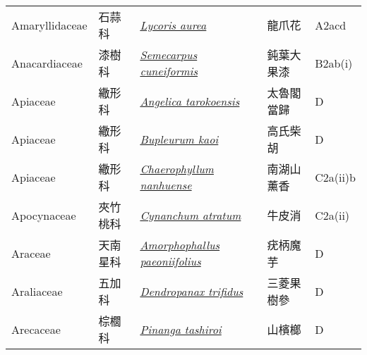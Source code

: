 {\begin{longtable}{L{2.5cm}L{2cm}L{5cm}L{2.5cm}L{3cm}}
    Amaryllidaceae & 石蒜科 & \href{http://www.theplantlist.org/tpl1.1/search?q=Lycoris+aurea}{\textit{Lycoris aurea} } & 龍爪花 & A2acd    \\
    Anacardiaceae & 漆樹科 & \href{http://www.theplantlist.org/tpl1.1/search?q=Semecarpus+cuneiformis}{\textit{Semecarpus cuneiformis} } & 鈍葉大果漆 & B2ab(i)    \\
    Apiaceae & 繖形科 & \href{http://www.theplantlist.org/tpl1.1/search?q=Angelica+tarokoensis}{\textit{Angelica tarokoensis} } & 太魯閣當歸 & D    \\
    Apiaceae & 繖形科 & \href{http://www.theplantlist.org/tpl1.1/search?q=Bupleurum+kaoi}{\textit{Bupleurum kaoi} } & 高氏柴胡 & D    \\
    Apiaceae & 繖形科 & \href{http://www.theplantlist.org/tpl1.1/search?q=Chaerophyllum+nanhuense}{\textit{Chaerophyllum nanhuense} } & 南湖山薰香 & C2a(ii)b    \\
    Apocynaceae & 夾竹桃科 & \href{http://www.theplantlist.org/tpl1.1/search?q=Cynanchum+atratum}{\textit{Cynanchum atratum} } & 牛皮消 & C2a(ii)    \\
    Araceae & 天南星科 & \href{http://www.theplantlist.org/tpl1.1/search?q=Amorphophallus+paeoniifolius}{\textit{Amorphophallus paeoniifolius} } & 疣柄魔芋 & D    \\
    Araliaceae & 五加科 & \href{http://www.theplantlist.org/tpl1.1/search?q=Dendropanax+trifidus}{\textit{Dendropanax trifidus} } & 三菱果樹參 & D    \\
    Arecaceae & 棕櫚科 & \href{http://www.theplantlist.org/tpl1.1/search?q=Pinanga+tashiroi}{\textit{Pinanga tashiroi} } & 山檳榔 & D    \\

\end{longtable}}
